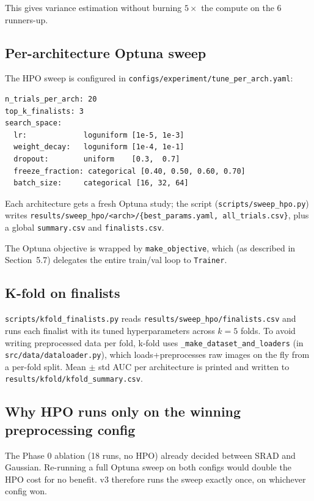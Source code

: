 \documentclass[10pt,a4paper]{article}
\begin{document}
This gives variance estimation without burning $5\times$ the compute
on the 6 runners-up.

\subsection{Per-architecture Optuna sweep}

The HPO sweep is configured in
\texttt{configs/experiment/tune\_per\_arch.yaml}:

\begin{verbatim}
n_trials_per_arch: 20
top_k_finalists: 3
search_space:
  lr:             loguniform [1e-5, 1e-3]
  weight_decay:   loguniform [1e-4, 1e-1]
  dropout:        uniform    [0.3,  0.7]
  freeze_fraction: categorical [0.40, 0.50, 0.60, 0.70]
  batch_size:     categorical [16, 32, 64]
\end{verbatim}

Each architecture gets a fresh Optuna study; the script
(\texttt{scripts/sweep\_hpo.py}) writes
\texttt{results/sweep\_hpo/<arch>/\{best\_params.yaml, all\_trials.csv\}},
plus a global \texttt{summary.csv} and \texttt{finalists.csv}.

The Optuna objective is wrapped by \texttt{make\_objective}, which
(as described in Section~5.7) delegates the entire train/val loop to
\texttt{Trainer}.

\subsection{K-fold on finalists}

\texttt{scripts/kfold\_finalists.py} reads
\texttt{results/sweep\_hpo/finalists.csv} and runs each finalist with
its tuned hyperparameters across $k=5$ folds. To avoid writing
preprocessed data per fold, k-fold uses
\texttt{\_make\_dataset\_and\_loaders} (in
\texttt{src/data/dataloader.py}), which loads+preprocesses raw images
on the fly from a per-fold split. Mean $\pm$ std AUC per architecture
is printed and written to \texttt{results/kfold/kfold\_summary.csv}.

\subsection{Why HPO runs only on the winning preprocessing config}

The Phase 0 ablation (18 runs, no HPO) already decided between SRAD
and Gaussian. Re-running a full Optuna sweep on both configs would
double the HPO cost for no benefit. v3 therefore runs the sweep
exactly once, on whichever config won.
\end{document}
